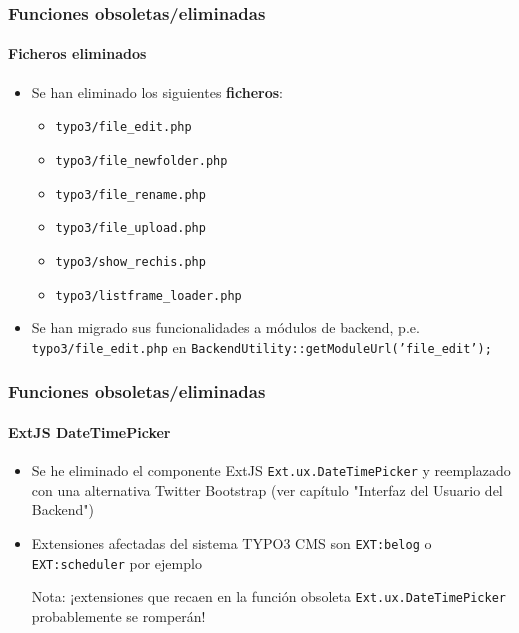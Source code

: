 \begin{frame}[fragile]
	\frametitle{Funciones obsoletas/eliminadas}
	\framesubtitle{Ficheros eliminados}

	\begin{itemize}
		\item Se han eliminado los siguientes \textbf{ficheros}:

			\begin{itemize}
				\item \texttt{typo3/file\_edit.php}
				\item \texttt{typo3/file\_newfolder.php}
				\item \texttt{typo3/file\_rename.php}
				\item \texttt{typo3/file\_upload.php}
				\item \texttt{typo3/show\_rechis.php}
				\item \texttt{typo3/listframe\_loader.php}
			\end{itemize}

		\item Se han migrado sus funcionalidades a módulos de backend,
			p.e. \texttt{typo3/file\_edit.php} en \texttt{BackendUtility::getModuleUrl('file\_edit');}

	\end{itemize}

\end{frame}


\begin{frame}[fragile]
	\frametitle{Funciones obsoletas/eliminadas}
	\framesubtitle{ExtJS DateTimePicker}

	\begin{itemize}

		\item Se he eliminado el componente ExtJS \texttt{Ext.ux.DateTimePicker} y reemplazado
			con una alternativa Twitter Bootstrap (ver capítulo "Interfaz del Usuario del Backend")

		\item Extensiones afectadas del sistema TYPO3 CMS son \texttt{EXT:belog} o
			\texttt{EXT:scheduler} por ejemplo

			\vspace{0.2cm}

			\begingroup
				\color{red}
					Nota: ¡extensiones que recaen en la función obsoleta
					\texttt{Ext.ux.DateTimePicker} probablemente se romperán!
			\endgroup

	\end{itemize}

\end{frame}

